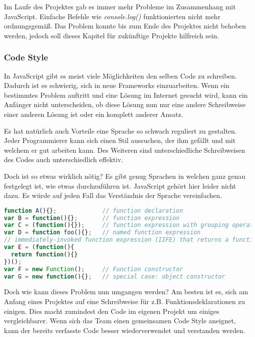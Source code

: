 
Im Laufe des Projektes gab es immer mehr Probleme im Zusammenhang mit JavaScript. Einfache Befehle wie \textit{console.log()} funktionierten nicht mehr ordnungsgemäß. Das Problem konnte bis zum Ende des Projektes nicht behoben werden, jedoch soll dieses Kapitel für zukünftige Projekte hilfreich sein.

\subsubsection{Code Style}
In JavaScript gibt es meist viele Möglichkeiten den selben Code zu schreiben. Dadurch ist es schwierig, sich in neue Frameworks einzuarbeiten. Wenn ein bestimmtes Problem auftritt und eine Lösung im Internet gesucht wird, kann ein Anfänger nicht unterscheiden, ob diese Lösung nun nur eine andere Schreibweise einer anderen Lösung ist oder ein komplett anderer Ansatz. 

Es hat natürlich auch Vorteile eine Sprache so schwach reguliert zu gestalten. Jeder Programmierer kann sich einen Stil aussuchen, der ihm gefällt und mit welchem er gut arbeiten kann. Des Weiteren sind unterschiedliche Schreibweisen des Codes auch unterschiedlich effektiv. 

Doch ist so etwas wirklich nötig? Es gibt genug Sprachen in welchen ganz genau festgelegt ist, wie etwas durchzuführen ist. JavaScript gehört hier leider nicht dazu. Es würde auf jeden Fall das Verständnis der Sprache vereinfachen. 

\begin{lstlisting}[caption = Unterschiedliche Möglichkeiten eine Funktion zu deklarieren\cite{JSOP1}, label = jsopfn, language=Javascript]
function A(){};             // function declaration
var B = function(){};       // function expression
var C = (function(){});     // function expression with grouping operators
var D = function foo(){};   // named function expression
// immediately-invoked function expression (IIFE) that returns a function
var E = (function(){ 
  return function(){}
})();
var F = new Function();     // Function constructor
var G = new function(){};   // special case: object constructor

\end{lstlisting}

Doch wie kann dieses Problem nun umgangen werden? Am besten ist es, sich am Anfang eines Projektes auf eine Schreibweise für z.B. Funktionsdeklarationen zu einigen. Dies macht zumindest den Code im eigenen Projekt um einiges vergleichbarer. Wenn sich das Team einen gemeinsamen Code Style aneignet, kann der bereits verfasste Code besser wiederverwendet und verstanden werden.

